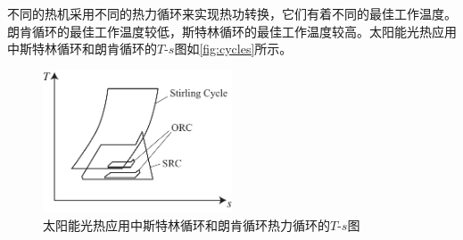 不同的热机采用不同的热力循环来实现热功转换，它们有着不同的最佳工作温度。朗肯循环的最佳工作温度较低，斯特林循环的最佳工作温度较高。太阳能光热应用中斯特林循环和朗肯循环的$T$-$s$图如\autoref{fig:cycles}所示。
\begin{figure}[htb]
\centering 
\includegraphics[width=0.5\textwidth]{fig/cycles}
\caption{太阳能光热应用中斯特林循环和朗肯循环热力循环的$T$-$s$图}\label{fig:cycles}
\end{figure}


